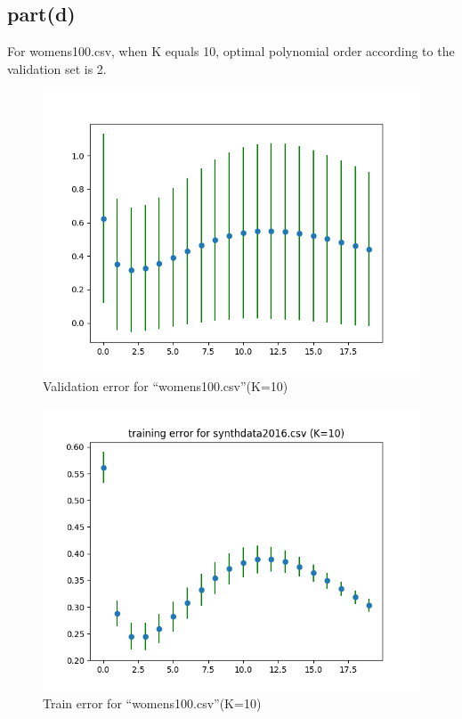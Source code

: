 \documentclass[12pt]{amsart}
\begin{document}
\subsection*{part(d)}
For womens100.csv, when K equals 10, optimal polynomial order according to the validation set is 2. 
\begin{figure}
    \centering
    \includegraphics[scale=0.7]{K=10_women.png}
    \caption{Validation error for ``womens100.csv''(K=10)}
    \label{fig:my_label}
\end{figure}
\begin{figure}
    \centering
    \includegraphics[scale=0.7]{K=10_women_t.png}
    \caption{Train error for ``womens100.csv''(K=10)}
    \label{fig:my_label}
\end{figure}
\end{document}
